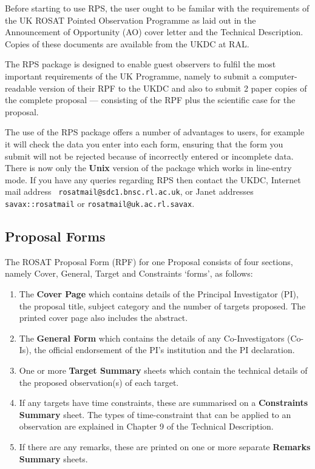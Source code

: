 Before starting to use RPS, the user ought to be familar with the
requirements of the UK ROSAT Pointed Observation Programme as laid out
in the Announcement of Opportunity (AO) cover letter and the Technical
Description. Copies of these documents are available from the UKDC at
RAL.

The RPS package is designed to enable guest observers to fulfil the
most important requirements of the UK Programme, namely to submit a
computer-readable version of their RPF to the UKDC and also to submit 2
paper copies of the complete proposal --- consisting of the RPF plus
the scientific case for the proposal.

The use of the RPS package offers a number of advantages to users, for
example it will check the data you enter into each form, ensuring that
the form you submit will not be rejected because of incorrectly entered
or incomplete data.  There is now only the {\bf Unix} version of the
package which works in line-entry mode.  If you have any queries
regarding RPS then contact the UKDC, Internet mail address  {\tt
rosatmail@sdc1.bnsc.rl.ac.uk}, or Janet addresses {\tt
savax::rosatmail} or {\tt rosatmail@uk.ac.rl.savax}.

\subsection{Proposal Forms}
\label{sse:forms}

The ROSAT Proposal Form (RPF) for one Proposal consists of four
sections, namely Cover, General, Target and Constraints `forms',
as follows:

\begin{enumerate}

\item The {\bf Cover Page} which contains details of the Principal
Investigator (PI), the proposal title, subject category and the number
of targets proposed. The printed cover page also includes the abstract.

\item The {\bf General Form} which contains the
details of any Co-Investigators (Co-Is), the official endorsement of
the PI's institution and the PI declaration.

\item One or more {\bf Target Summary} sheets which contain the
technical details of the proposed observation(s) of each target.

\item If any targets have time constraints, these are summarised on a
{\bf Constraints Summary} sheet. The types of time-constraint that can
be applied to an observation are explained in Chapter 9 of the
Technical Description.

\item If there are any remarks, these are printed on one or more separate
{\bf Remarks Summary} sheets.

\end{enumerate}

